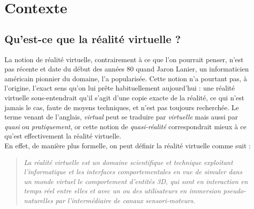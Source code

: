 \section{Contexte}

\subsection{Qu'est-ce que la réalité virtuelle ?}La notion de réalité virtuelle, contrairement à ce que l'on pourrait penser, n'est pas récente et date du début des années 80 quand Jaron Lanier, un informaticien américain pionnier du domaine, l'a popularisée. Cette notion n'a pourtant pas, à l'origine, l'exact sens qu'on lui prête habituellement aujourd'hui : une réalité virtuelle sous-entendrait qu'il s'agit d'une copie exacte de la réalité, ce qui n'est jamais le cas, faute de moyens techniques, et n'est pas toujours recherchée. Le terme venant  de l'anglais, \emph{virtual} peut se traduire par \emph{virtuelle} mais aussi par \emph{quasi} ou \emph{pratiquement}, or cette notion de \emph{quasi-réalité} correspondrait mieux à ce qu'est effectivement la réalité virtuelle. \\

En effet, de manière plus formelle, on peut définir la réalité virtuelle comme suit :

\begin{quote}\og \emph{La réalité virtuelle est un domaine scientifique et technique exploitant l'informatique et les interfaces comportementales en vue de simuler dans un monde virtuel le comportement d'entités 3D, qui sont en interaction en temps réel entre elles et avec un ou des utilisateurs en immersion pseudo-naturelles par l'intermédiaire de canaux sensori-moteurs.} \fg{}\end{quote}\cite{traiteRV1}

